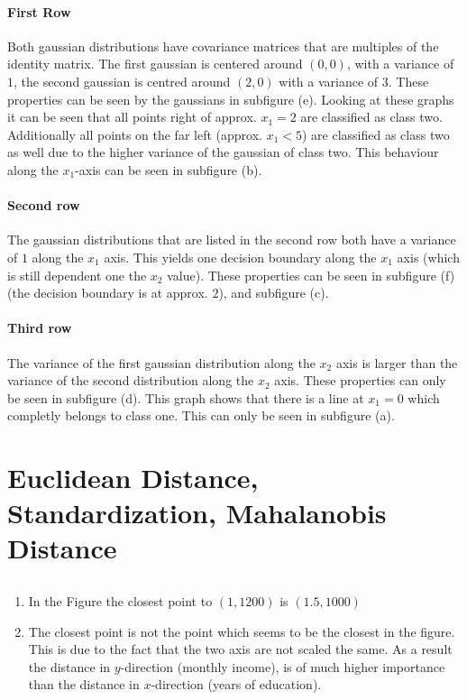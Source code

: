 \documentclass[DIN, pagenumber=false, fontsize=11pt, parskip=half]{scrartcl}
\begin{document}
    \paragraph{First Row}
    Both gaussian distributions have covariance matrices that are multiples of the identity matrix. 
    The first gaussian is centered around $(0,0)$, with a variance of $1$, the second gaussian is centred around $(2,0)$ with a variance of $3$.
    These properties can be seen by the gaussians in subfigure (e). 
    Looking at these graphs it can be seen that all points right of approx. $x_1 = 2$ are classified as class two.
    Additionally all points on the far left (approx. $x_1 < 5$) are classified as class two as well due to the higher variance of the gaussian of class two.
    This behaviour along the $x_1$-axis can be seen in subfigure (b).

    \paragraph{Second row}
    The gaussian distributions that are listed in the second row both have a variance of $1$ along the $x_1$ axis. 
    This yields one decision boundary along the $x_1$ axis (which is still dependent one the $x_2$ value).
    These properties can be seen in subfigure (f) (the decision boundary is at approx. $2$), and subfigure (c).

    \paragraph{Third row}
    The variance of the first gaussian distribution along the $x_2$ axis is larger than the variance of the second distribution along the $x_2$ axis.
    These properties can only be seen in subfigure (d). This graph shows that there is a line at $x_1 =0$ which completly belongs to class one.
    This can only be seen in subfigure (a).

    \section{Euclidean Distance, Standardization, Mahalanobis Distance}
    \subsection{}
    \begin{enumerate}[label=\alph*)]
        \item In the Figure the closest point to $(1,1200)$ is $(1.5,1000)$
        \item The closest point is not the point which seems to be the closest in the figure. This is due to the fact that the two axis are not scaled the same. 
            As a result the distance in $y$-direction (monthly income), is of much higher importance than the distance in $x$-direction (years of education).
    \end{enumerate}
\end{document}
